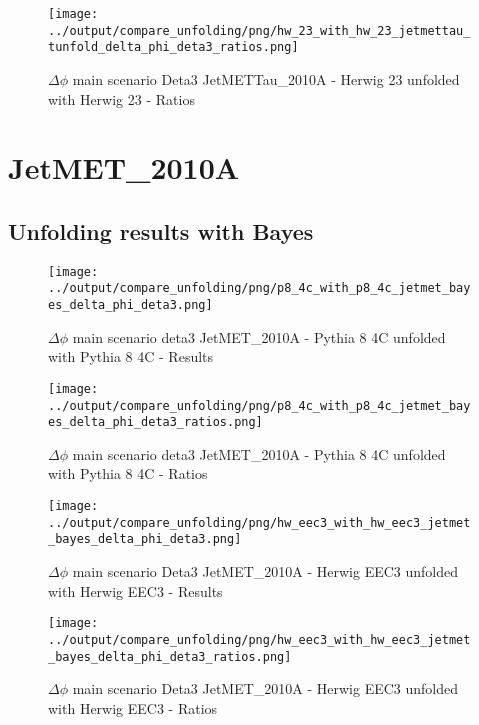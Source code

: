 \documentclass[11pt]{book}
\begin{document}
\begin{figure}[ht]
\centering
\texttt{[image: ../output/compare\_unfolding/png/hw\_23\_with\_hw\_23\_jetmettau\_tunfold\_delta\_phi\_deta3\_ratios.png]}
\caption{$\Delta\phi$ main scenario Deta3 JetMETTau\_2010A - Herwig 23 unfolded with Herwig 23 - Ratios}
\label{hw_23_hw_23_jetmettau_tunfold_delta_phi_deta3_b}
\end{figure}


\clearpage
\section{JetMET\_2010A}
\subsection{Unfolding results with Bayes}

\begin{figure}[ht]
\centering
\texttt{[image: ../output/compare\_unfolding/png/p8\_4c\_with\_p8\_4c\_jetmet\_bayes\_delta\_phi\_deta3.png]}
\caption{$\Delta\phi$ main scenario deta3 JetMET\_2010A - Pythia 8 4C unfolded with Pythia 8 4C - Results}
\label{p8_p8_jetmet_bayes_delta_phi_deta3_a}
\end{figure}

\begin{figure}[ht]
\centering
\texttt{[image: ../output/compare\_unfolding/png/p8\_4c\_with\_p8\_4c\_jetmet\_bayes\_delta\_phi\_deta3\_ratios.png]}
\caption{$\Delta\phi$ main scenario deta3 JetMET\_2010A - Pythia 8 4C unfolded with Pythia 8 4C - Ratios}
\label{p8_p8_jetmet_bayes_delta_phi_deta3_b}
\end{figure}

\begin{figure}[ht]
\centering
\texttt{[image: ../output/compare\_unfolding/png/hw\_eec3\_with\_hw\_eec3\_jetmet\_bayes\_delta\_phi\_deta3.png]}
\caption{$\Delta\phi$ main scenario Deta3 JetMET\_2010A - Herwig EEC3 unfolded with Herwig EEC3 - Results}
\label{hw_eec3_hw_eec3_jetmet_bayes_delta_phi_deta3_a}
\end{figure}

\begin{figure}[ht]
\centering
\texttt{[image: ../output/compare\_unfolding/png/hw\_eec3\_with\_hw\_eec3\_jetmet\_bayes\_delta\_phi\_deta3\_ratios.png]}
\caption{$\Delta\phi$ main scenario Deta3 JetMET\_2010A - Herwig EEC3 unfolded with Herwig EEC3 - Ratios}
\label{hw_eec3_hw_eec3_jetmet_bayes_delta_phi_deta3_b}
\end{figure}
\end{document}
